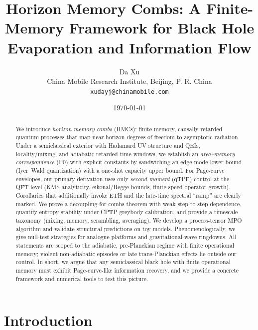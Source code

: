 \documentclass[11pt,a4paper]{article}
\title{Horizon Memory Combs: A Finite-Memory Framework for Black Hole Evaporation and Information Flow}
\author{Da Xu\\
\small China Mobile Research Institute, Beijing, P. R. China\\
\small \texttt{xudayj@chinamobile.com}}
\date{\today}
\theoremstyle{plain}
\theoremstyle{definition}
\theoremstyle{remark}
\begin{document}
\maketitle

\begin{abstract}
We introduce \emph{horizon memory combs} (HMCs): finite-memory, causally
retarded quantum processes that map near-horizon degrees of freedom to asymptotic
radiation. Under a semiclassical exterior with Hadamard UV structure and QEIs,
locality/mixing, and adiabatic retarded-time windows, we establish an
\emph{area--memory correspondence} (P0) with explicit constants by sandwiching an
edge-mode lower bound (Iyer--Wald quantization) with a one-shot capacity upper bound.
For Page-curve envelopes, our primary derivation uses only \emph{second-moment} (qTPE)
control at the QFT level (KMS analyticity, eikonal/Regge bounds, finite-speed operator
growth). Corollaries that additionally invoke ETH and the late-time spectral ``ramp''
are clearly marked. We prove a decoupling-for-combs theorem with weak step-to-step
dependence, quantify entropy stability under CPTP greybody calibration, and provide a
timescale taxonomy (mixing, memory, scrambling, averaging). We develop a process-tensor
MPO algorithm and validate structural predictions on toy models. Phenomenologically,
we give null-test strategies for analogue platforms and gravitational-wave ringdowns.
All statements are scoped to the adiabatic, pre-Planckian regime with finite operational
memory; violent non-adiabatic episodes or late trans-Planckian effects lie outside our control.
In short, we argue that any semiclassical black hole with finite operational memory must exhibit Page-curve-like information recovery, and we provide a concrete framework and numerical tools to test this picture.
\end{abstract}

\newcommand{\condtag}{\textsuperscript{(C1--C3)}}


\section{Introduction}
\label{sec:intro}
\end{document}
